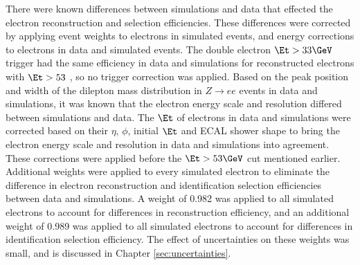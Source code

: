 There were known differences between simulations and data that effected the electron reconstruction and selection 
efficiencies.  These differences were corrected by applying event weights to electrons in simulated events, and energy 
corrections to electrons in data and simulated events.  The double electron $\Et > 33 \GeV$ trigger had the same 
efficiency in data and simulations for reconstructed electrons with $\Et > 53$ \GeV, so no trigger correction 
was applied.  Based on the peak position and width of the dilepton mass distribution in $Z \rightarrow ee$ 
events in data and simulations, it was known that the electron energy scale and resolution differed between simulations 
and data.  The $\Et$ of electrons in data and simulations were corrected based on their $\eta$, $\phi$, initial $\Et$ 
and ECAL shower shape to bring the electron energy scale and resolution in data and simulations into agreement.  
These corrections were applied before the $\Et > 53 \GeV$ cut mentioned earlier.  Additional weights were applied 
to every simulated electron to eliminate the difference in electron reconstruction and identification selection 
efficiencies between data and simulations.  A weight of 0.982 was applied to all simulated electrons to account for 
differences in reconstruction efficiency, and an additional weight of 0.989 was applied to all simulated electrons to 
account for differences in identification selection efficiency.  The effect of uncertainties on these weights was 
small, and is discussed in Chapter \ref{sec:uncertainties}.


